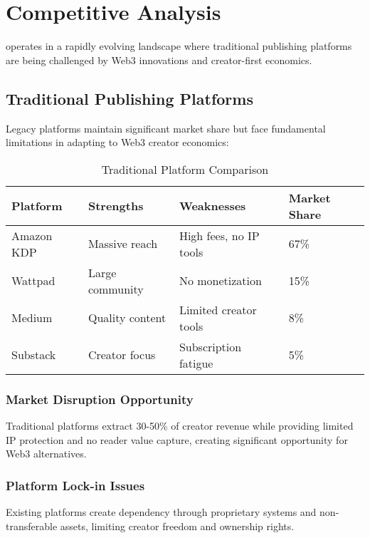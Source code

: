 \section{Competitive Analysis}
\label{sec:competitive-analysis}

\storyhouse{} operates in a rapidly evolving landscape where traditional publishing platforms are being challenged by Web3 innovations and creator-first economics.

\subsection{Traditional Publishing Platforms}

Legacy platforms maintain significant market share but face fundamental limitations in adapting to Web3 creator economics:

\begin{table}[H]
\centering
\caption{Traditional Platform Comparison}
\label{tab:traditional-comparison}
\begin{tabular}{@{}llll@{}}
\toprule
\textbf{Platform} & \textbf{Strengths} & \textbf{Weaknesses} & \textbf{Market Share} \\
\midrule
Amazon KDP & Massive reach & High fees, no IP tools & 67\% \\
Wattpad & Large community & No monetization & 15\% \\
Medium & Quality content & Limited creator tools & 8\% \\
Substack & Creator focus & Subscription fatigue & 5\% \\
\bottomrule
\end{tabular}
\end{table}

\subsubsection{Market Disruption Opportunity}

Traditional platforms extract 30-50\% of creator revenue while providing limited IP protection and no reader value capture, creating significant opportunity for Web3 alternatives.

\subsubsection{Platform Lock-in Issues}

Existing platforms create dependency through proprietary systems and non-transferable assets, limiting creator freedom and ownership rights.

